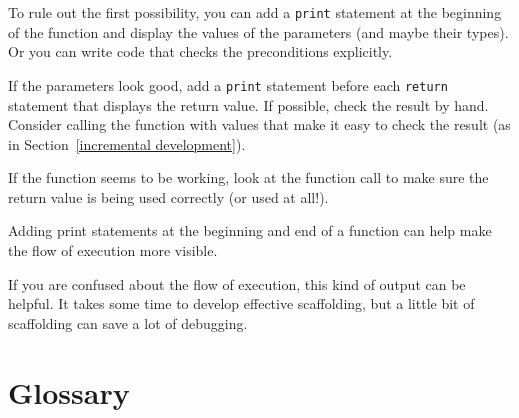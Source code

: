 To rule out the first possibility, you can add a {\tt print} statement
at the beginning of the function and display the values of the
parameters (and maybe their types).  Or you can write code
that checks the preconditions explicitly.


If the parameters look good, add a {\tt print} statement before each
{\tt return} statement that displays the return value.  If
possible, check the result by hand.  Consider calling the
function with values that make it easy to check the result
(as in Section~\ref{incremental development}).

If the function seems to be working, look at the function call
to make sure the return value is being used correctly (or used
at all!).


Adding print statements at the beginning and end of a function
can help make the flow of execution more visible.

If you are confused about the flow of execution, this kind of
output can be helpful.  It takes some time to develop effective
scaffolding, but a little bit of scaffolding can save a lot of debugging.


\section{Glossary}

